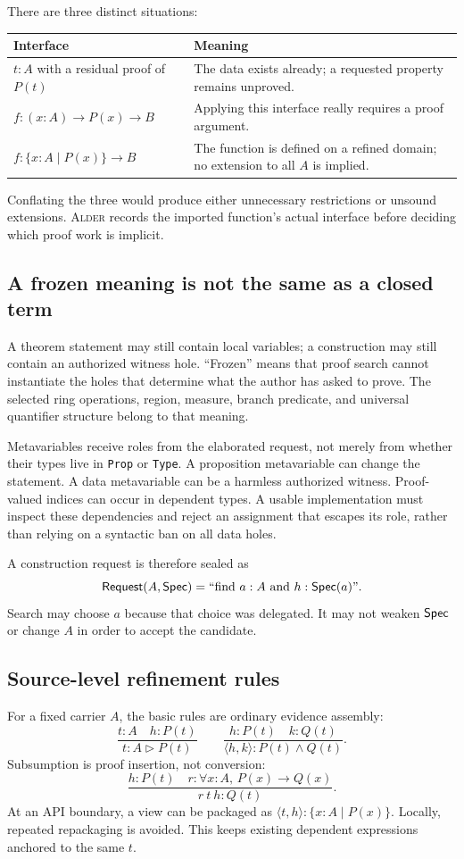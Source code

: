 \documentclass[11pt,a4paper]{article}
\newcommand{\code}[1]{\nolinkurl{#1}}
\newcommand{\Alder}{\textsc{Alder}}
\theoremstyle{plain}
\theoremstyle{definition}
\theoremstyle{remark}
\begin{document}
There are three distinct situations:
\begin{center}\small
\begin{tabularx}{\textwidth}{@{}P{.25\textwidth}Y@{}}
\toprule Interface & Meaning\\\midrule
$t:A$ with a residual proof of $P(t)$ & The data exists already; a requested property remains unproved.\\
$f:(x:A)\to P(x)\to B$ & Applying this interface really requires a proof argument.\\
$f:\{x:A\mid P(x)\}\to B$ & The function is defined on a refined domain; no extension to all $A$ is implied.\\
\bottomrule
\end{tabularx}
\end{center}
Conflating the three would produce either unnecessary restrictions or unsound extensions. \Alder{} records the imported function's actual interface before deciding which proof work is implicit.

\subsection{A frozen meaning is not the same as a closed term}
A theorem statement may still contain local variables; a construction may still contain an authorized witness hole. ``Frozen'' means that proof search cannot instantiate the holes that determine what the author has asked to prove. The selected ring operations, region, measure, branch predicate, and universal quantifier structure belong to that meaning.

Metavariables receive roles from the elaborated request, not merely from whether their types live in \code{Prop} or \code{Type}. A proposition metavariable can change the statement. A data metavariable can be a harmless authorized witness. Proof-valued indices can occur in dependent types. A usable implementation must inspect these dependencies and reject an assignment that escapes its role, rather than relying on a syntactic ban on all data holes.

A construction request is therefore sealed as
\[
 \mathsf{Request}(A,\mathsf{Spec})=\text{``find }a:A\text{ and }h:\mathsf{Spec}(a)\text{''}.
\]
Search may choose $a$ because that choice was delegated. It may not weaken $\mathsf{Spec}$ or change $A$ in order to accept the candidate.

\subsection{Source-level refinement rules}
For a fixed carrier $A$, the basic rules are ordinary evidence assembly:
\[
\frac{t:A\quad h:P(t)}{t:A\triangleright P(t)}
\qquad
\frac{h:P(t)\quad k:Q(t)}{\langle h,k\rangle:P(t)\wedge Q(t)}.
\]
Subsumption is proof insertion, not conversion:
\[
\frac{h:P(t)\quad r:\forall x:A,\,P(x)\to Q(x)}{r\ t\ h:Q(t)}.
\]
At an API boundary, a view can be packaged as $\langle t,h\rangle:\{x:A\mid P(x)\}$. Locally, repeated repackaging is avoided. This keeps existing dependent expressions anchored to the same $t$.
\end{document}
